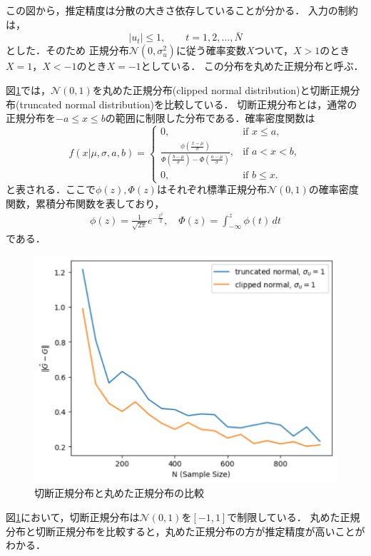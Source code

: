 この図から，推定精度は分散の大きさ依存していることが分かる．
入力の制約は，
\begin{equation*}
|u_{t}| \leq 1, \quad \quad  t = 1, 2, \ldots,\bar{N}
\end{equation*}
とした．そのため
正規分布$\mathcal{N}(0, \sigma_u^2)$に従う確率変数$X$ついて，$X>1$のとき$X = 1$，$X<-1$のとき$X = -1$としている．
この分布を丸めた正規分布と呼ぶ．

図\ref{t_vs_c}では，$\mathcal{N}(0, 1)$を丸めた正規分布(clipped normal distribution)と切断正規分布(truncated normal distribution)を比較している．
切断正規分布とは，通常の正規分布を$-a \leq x \leq b$の範囲に制限した分布である．確率密度関数は
\begin{equation*}
f(x|\mu, \sigma, a, b) =
\begin{cases}
0, & \text{if } x \leq a, \\
\frac{\phi(\frac{x-\mu}{\sigma})}{\Phi(\frac{b-\mu}{\sigma}) - \Phi(\frac{a-\mu}{\sigma})}, & \text{if } a < x < b, \\
0, & \text{if } b \leq x.
\end{cases}
\end{equation*}
と表される．ここで$\phi(z), \Phi(z)$はそれぞれ標準正規分布$\mathcal{N}(0, 1)$の確率密度関数，累積分布関数を表しており，
\begin{align*}
    \phi(z) = \frac{1}{\sqrt{2\pi}}e^{-\frac{z^2}{2}}, \quad
    \Phi(z) = \int_{-\infty}^{z} \phi(t) \, dt
\end{align*}
である．
\begin{figure}[htbp]
    \centering
    \includegraphics[width=0.8\linewidth]{figure/figure2.pdf}
    \caption{切断正規分布と丸めた正規分布の比較}
    \label{t_vs_c}
\end{figure}
図\ref{t_vs_c}において，切断正規分布は$\mathcal{N}(0, 1)$を$[-1, 1]$で制限している．
丸めた正規分布と切断正規分布を比較すると，丸めた正規分布の方が推定精度が高いことがわかる．

